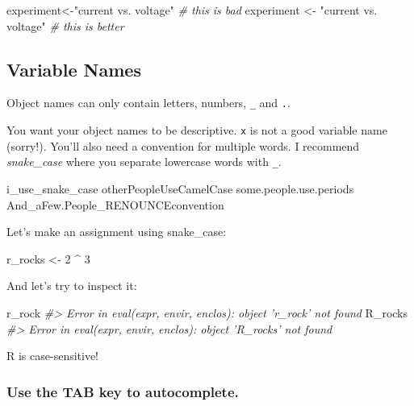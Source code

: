 \documentclass[]{book}
\newenvironment{Shaded}{\begin{snugshade}}{\end{snugshade}}
\newcommand{\DecValTok}[1]{\textcolor[rgb]{0.00,0.00,0.81}{#1}}
\newcommand{\StringTok}[1]{\textcolor[rgb]{0.31,0.60,0.02}{#1}}
\newcommand{\CommentTok}[1]{\textcolor[rgb]{0.56,0.35,0.01}{\textit{#1}}}
\newcommand{\OperatorTok}[1]{\textcolor[rgb]{0.81,0.36,0.00}{\textbf{#1}}}
\newcommand{\NormalTok}[1]{#1}
\begin{document}
\begin{Shaded}
\begin{Highlighting}[]
\NormalTok{experiment<-}\StringTok{"current vs. voltage"}   \CommentTok{# this is bad}
\NormalTok{experiment <-}\StringTok{ "current vs. voltage"} \CommentTok{# this is better}
\end{Highlighting}
\end{Shaded}

\subsection{Variable Names}\label{variable-names}

Object names can only contain letters, numbers, \texttt{\_} and
\texttt{.}.

You want your object names to be descriptive. \texttt{x} is not a good
variable name (sorry!). You'll also need a convention for multiple
words. I recommend \emph{snake\_case} where you separate lowercase words
with \texttt{\_}.

\begin{Shaded}
\begin{Highlighting}[]
\NormalTok{i_use_snake_case}
\NormalTok{otherPeopleUseCamelCase}
\NormalTok{some.people.use.periods}
\NormalTok{And_aFew.People_RENOUNCEconvention}
\end{Highlighting}
\end{Shaded}

Let's make an assignment using snake\_case:

\begin{Shaded}
\begin{Highlighting}[]
\NormalTok{r_rocks <-}\StringTok{ }\DecValTok{2} \OperatorTok{^}\StringTok{ }\DecValTok{3}
\end{Highlighting}
\end{Shaded}

And let's try to inspect it:

\begin{Shaded}
\begin{Highlighting}[]
\NormalTok{r_rock}
\CommentTok{#> Error in eval(expr, envir, enclos): object 'r_rock' not found}
\NormalTok{R_rocks}
\CommentTok{#> Error in eval(expr, envir, enclos): object 'R_rocks' not found}
\end{Highlighting}
\end{Shaded}

R is case-sensitive!

\subsubsection*{Use the TAB key to
autocomplete.}\label{use-the-tab-key-to-autocomplete.}
\end{document}
